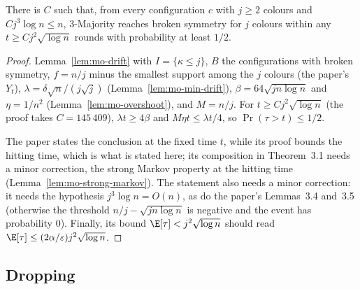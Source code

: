 \begin{lemma}\label{lem:mo-breaking}
\leanok
{}
There is $C$ such that, from every configuration $c$ with $j\ge2$ colours and $Cj^3\log n\le n$,
3-Majority reaches broken symmetry for $j$ colours within any $t\ge Cj^2\sqrt{\log n}$ rounds with
probability at least $1/2$.
\end{lemma}
\begin{proof}\leanok
Lemma~\ref{lem:mo-drift} with $I=\{\kappa\le j\}$, $B$ the configurations with broken symmetry,
$f=n/j$ minus the smallest support among the $j$ colours (the paper's $Y_t$),
$\lambda=\delta\sqrt n/(j\sqrt j)$ (Lemma~\ref{lem:mo-min-drift}), $\beta=64\sqrt{jn\log n}$ and
$\eta=1/n^2$ (Lemma~\ref{lem:mo-overshoot}), and $M=n/j$. For $t\ge Cj^2\sqrt{\log n}$ (the proof
takes $C=145\,409$), $\lambda t\ge4\beta$ and $M\eta t\le\lambda t/4$, so $\Pr(\tau>t)\le1/2$.

The paper states the conclusion at the fixed time $t$, while its proof bounds the hitting time,
which is what is stated here; its composition in Theorem~3.1 needs a minor correction, the strong
Markov property at the hitting time (Lemma~\ref{lem:mo-strong-markov}). The statement also needs
a minor correction: it needs the hypothesis $j^3\log n=O(n)$, as do the paper's Lemmas~3.4
and~3.5 (otherwise
the threshold $n/j-\sqrt{jn\log n}$ is negative and the event has probability $0$). Finally, its
bound $\E[\tau]<j^2\sqrt{\log n}$ should read $\E[\tau]\le(2\alpha/\varepsilon)j^2\sqrt{\log n}$.
\end{proof}

\subsection{Dropping}

